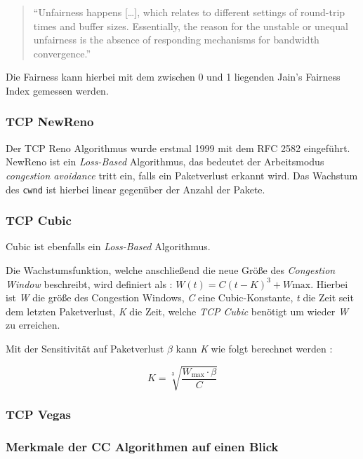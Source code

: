\documentclass[paper=a4,fontsize=12pt,ngerman]{scrartcl}
\begin{document}

\begin{quote}
``Unfairness happens [\dots], which relates to different settings of round-trip times and buffer sizes.
Essentially, the reason for the unstable or unequal unfairness is the absence of responding mechanisms for bandwidth convergence.''\cite{tang24BBRns3}
\end{quote}
 

Die Fairness kann hierbei mit dem zwischen 0 und 1 liegenden Jain's Fairness Index gemessen werden.\cite{DBLP:journals/corr/cs-NI-9809099}

\subsubsection{TCP NewReno}
Der TCP Reno Algorithmus wurde erstmal 1999 mit dem RFC 2582 eingeführt.\cite{rfc2582}
NewReno ist ein \textit{Loss-Based} Algorithmus, das bedeutet der
Arbeitsmodus \textit{congestion avoidance} tritt ein, falls ein Paketverlust erkannt wird.
Das Wachstum des \texttt{cwnd} ist hierbei linear gegenüber der Anzahl der Pakete.


\subsubsection{TCP Cubic}
Cubic ist ebenfalls ein \textit{Loss-Based} Algorithmus.

Die Wachstumsfunktion, welche anschließend die neue Größe des \textit{Congestion Window}
beschreibt, wird definiert als : $ W(t) = C(t-K)^3 + W\text{max}.$  
Hierbei ist \textit{W} die größe des Congestion Windows, \textit{C} eine Cubic-Konstante, 
\textit{t} die Zeit seit dem letzten Paketverlust, \textit{K} die Zeit, welche \textit{TCP Cubic} benötigt 
um wieder \textit{W} zu erreichen.

Mit der Sensitivität auf Paketverlust $\beta$ kann \textit{K} wie folgt berechnet werden \cite{HArheeInjXuCUBIC} :

\[
K = \sqrt[3]{\frac{W_{\text{max}} \cdot \beta}{C}}     
\]


\subsubsection{TCP Vegas}

\clearpage

\subsubsection{Merkmale der CC Algorithmen auf einen Blick}
\end{document}
